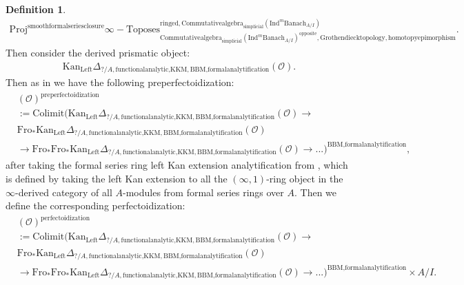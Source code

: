 \documentclass[11pt]{book}
\theoremstyle{definition}
\newtheorem{definition}[theorem]{Definition}
\numberwithin{equation}{section}
\begin{document}
\begin{definition}
\begin{align}
\mathrm{Proj}^\text{smoothformalseriesclosure}\infty-\mathrm{Toposes}^{\mathrm{ringed},\mathrm{Commutativealgebra}_{\mathrm{simplicial}}(\mathrm{Ind}^m\mathrm{Banach}_{A/I})}_{\mathrm{Commutativealgebra}_{\mathrm{simplicial}}(\mathrm{Ind}^m\mathrm{Banach}_{A/I})^\mathrm{opposite},\mathrm{Grothendiecktopology,homotopyepimorphism}}. 
\end{align}
Then consider the derived prismatic object:
\begin{align}
\mathrm{Kan}_{\mathrm{Left}}\Delta_{?/A,\text{functionalanalytic,KKM},\text{BBM,formalanalytification}}(\mathcal{O}).
\end{align}	
Then as in \cite[Definition 8.2]{12BS} we have the following preperfectoidization:
\begin{align}
&(\mathcal{O})^{\text{preperfectoidization}}\\
&:=\mathrm{Colimit}(\mathrm{Kan}_{\mathrm{Left}}\Delta_{?/A,\text{functionalanalytic,KKM},\text{BBM,formalanalytification}}(\mathcal{O})\rightarrow \\
&\mathrm{Fro}_*\mathrm{Kan}_{\mathrm{Left}}\Delta_{?/A,\text{functionalanalytic,KKM},\text{BBM,formalanalytification}}(\mathcal{O})\\
&\rightarrow \mathrm{Fro}_* \mathrm{Fro}_*\mathrm{Kan}_{\mathrm{Left}}\Delta_{?/A,\text{functionalanalytic,KKM},\text{BBM,formalanalytification}}(\mathcal{O})\rightarrow...)^{\text{BBM,formalanalytification}},	
\end{align}
after taking the formal series ring left Kan extension analytification from \cite[Section 4.2]{BBM}, which is defined by taking the left Kan extension to all the $(\infty,1)$-ring object in the $\infty$-derived category of all $A$-modules from formal series rings over $A$. Then we define the corresponding perfectoidization:
\begin{align}
&(\mathcal{O})^{\text{perfectoidization}}\\
&:=\mathrm{Colimit}(\mathrm{Kan}_{\mathrm{Left}}\Delta_{?/A,\text{functionalanalytic,KKM},\text{BBM,formalanalytification}}(\mathcal{O})\longrightarrow \\
&\mathrm{Fro}_*\mathrm{Kan}_{\mathrm{Left}}\Delta_{?/A,\text{functionalanalytic,KKM},\text{BBM,formalanalytification}}(\mathcal{O})\\
&\longrightarrow \mathrm{Fro}_* \mathrm{Fro}_*\mathrm{Kan}_{\mathrm{Left}}\Delta_{?/A,\text{functionalanalytic,KKM},\text{BBM,formalanalytification}}(\mathcal{O})\longrightarrow...)^{\text{BBM,formalanalytification}}\times A/I.	
\end{align}

\end{definition}
\end{document}
